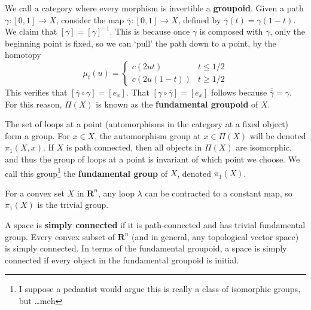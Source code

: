 We call a category where every morphism is invertible a {\bf groupoid}. Given a path $\gamma: [0,1] \to X$, consider the map $\overline{\gamma}: [0,1] \to X$, defined by $\overline{\gamma}(t) = \gamma(1 - t)$. We claim that $[\overline{\gamma}] = [\gamma]^{-1}$. This is because once $\gamma$ is composed with $\overline{\gamma}$, only the beginning point is fixed, so we can `pull' the path down to a point, by the homotopy
%
\[ \mu_t(u) = \begin{cases} c(2ut) & t \leq 1/2 \\ c(2u(1-t)) & t \geq 1/2 \end{cases} \]
%
This verifies that $[\overline{\gamma} \circ \gamma] = [e_x]$. That $[\gamma \circ \overline{\gamma}] = [e_x]$ follows because $\overline{\overline{\gamma}} = \gamma$. For this reason, $\Pi(X)$ is known as the {\bf fundamental groupoid} of $X$.

The set of loops at a point (automorphisms in the category at a fixed object) form a group. For $x \in X$, the automorphism group at $x \in \Pi(X)$ will be denoted $\pi_1(X,x)$. If $X$ is path connected, then all objects in $\Pi(X)$ are isomorphic, and thus the group of loops at a point is invariant of which point we choose. We call this group\footnote{I suppose a pedantist would argue this is really a class of isomorphic groups, but \dots meh} the {\bf fundamental group} of $X$, denoted $\pi_1(X)$.

\begin{example}
    For a convex set $X$ in $\mathbf{R}^n$, any loop $\lambda$ can be contracted to a constant map, so $\pi_1(X)$ is the trivial group.
\end{example}

A space is {\bf simply connected} if it is path-connected and has trivial fundamental group. Every convex subset of $\mathbf{R}^n$ (and in general, any topological vector space) is simply connected. In terms of the fundamental groupoid, a space is simply connected if every object in the fundamental groupoid is initial.

